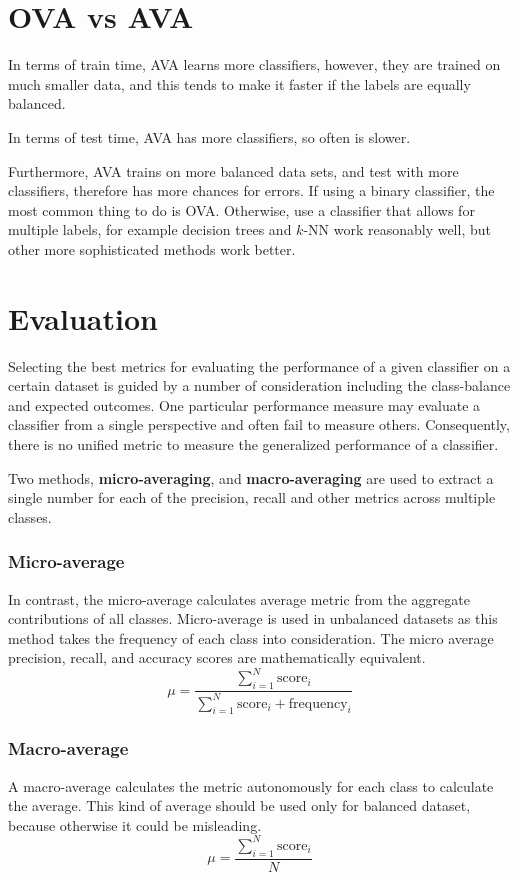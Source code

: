 \section{OVA vs AVA}
In terms of train time, AVA learns more classifiers, however, they are trained on much smaller data, and this tends to make it faster if the labels are equally balanced.

In terms of test time, AVA has more classifiers, so often is slower.

Furthermore, AVA trains on more balanced data sets, and test with more classifiers, therefore has more chances for errors. If using a binary classifier, the most common thing to do is OVA. Otherwise, use a classifier that allows for multiple labels, for example decision trees and \(k\)-NN work reasonably well, but other more sophisticated methods work better.

\section{Evaluation}

Selecting the best metrics for evaluating the performance of a given classifier on a certain dataset is guided by a number of consideration including the class-balance and expected outcomes. One particular performance measure may evaluate a classifier from a single perspective and often fail to measure others. Consequently, there is no unified metric to measure the generalized performance of a classifier.

Two methods, \textbf{micro-averaging}, and \textbf{macro-averaging} are used to extract a single number for each of the precision, recall and other metrics across multiple classes.

\subsubsection{Micro-average}
In contrast, the micro-average calculates average metric from the aggregate contributions of all classes. Micro-average is used in unbalanced datasets as this method takes the frequency of each class into consideration. The micro average precision, recall, and accuracy scores are mathematically equivalent.
\begin{equation}
	\mu = \frac {\sum_{i=1}^N \text{score}_i} {\sum_{i=1}^N \text{score}_i + \text{frequency}_i}
\end{equation}

\subsubsection{Macro-average}
A macro-average calculates the metric autonomously for each class to calculate the average. This kind of average should be used only for balanced dataset, because otherwise it could be misleading.
\begin{equation}
	\mu = \frac {\sum_{i=1}^N \text{score}_i} N
\end{equation}

